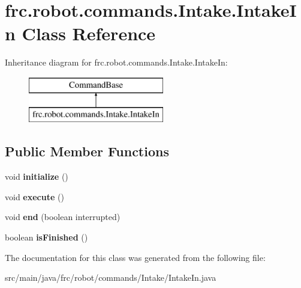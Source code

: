 \hypertarget{classfrc_1_1robot_1_1commands_1_1_intake_1_1_intake_in}{}\section{frc.\+robot.\+commands.\+Intake.\+Intake\+In Class Reference}
\label{classfrc_1_1robot_1_1commands_1_1_intake_1_1_intake_in}
Inheritance diagram for frc.\+robot.\+commands.\+Intake.\+Intake\+In\+:\begin{figure}[H]
\begin{center}
\leavevmode
\includegraphics[height=2.000000cm]{classfrc_1_1robot_1_1commands_1_1_intake_1_1_intake_in}
\end{center}
\end{figure}
\subsection*{Public Member Functions}
\begin{DoxyCompactItemize}
\item 
\mbox{\label{classfrc_1_1robot_1_1commands_1_1_intake_1_1_intake_in_a652ce86269f581ff222e9f5c0aad95ad}} 
void {\bfseries initialize} ()
\item 
\mbox{\label{classfrc_1_1robot_1_1commands_1_1_intake_1_1_intake_in_a4bba5336a762f879e270f32e6b727006}} 
void {\bfseries execute} ()
\item 
\mbox{\label{classfrc_1_1robot_1_1commands_1_1_intake_1_1_intake_in_ac974382511de6c5edb41a8c9511e3c2b}} 
void {\bfseries end} (boolean interrupted)
\item 
\mbox{\label{classfrc_1_1robot_1_1commands_1_1_intake_1_1_intake_in_abe976e7fc6831b7d7b96327b328a5660}} 
boolean {\bfseries is\+Finished} ()
\end{DoxyCompactItemize}


The documentation for this class was generated from the following file\+:\begin{DoxyCompactItemize}
\item 
src/main/java/frc/robot/commands/\+Intake/Intake\+In.\+java\end{DoxyCompactItemize}
